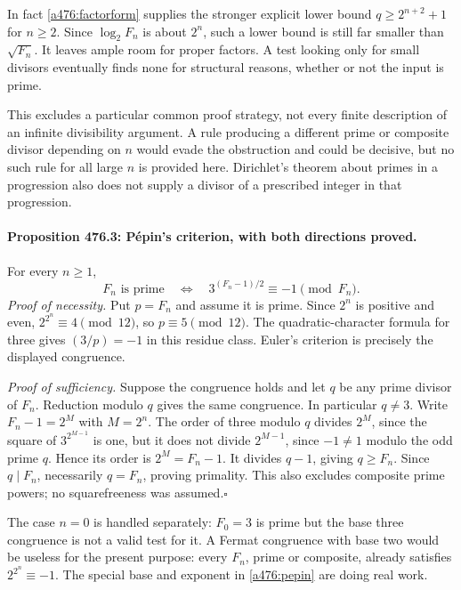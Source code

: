 \documentclass[11pt]{article}
\begin{document}
In fact \eqref{a476:factorform} supplies the stronger explicit lower
bound $q\geq2^{n+2}+1$ for $n\geq2$. Since
$\log_2F_n$ is about $2^n$, such a lower bound is still far smaller
than $\sqrt{F_n}$. It leaves ample room for proper factors. A test
looking only for small divisors eventually finds none for structural
reasons, whether or not the input is prime.

This excludes a particular common proof strategy, not every finite
description of an infinite divisibility argument. A rule producing a
different prime or composite divisor depending on $n$ would evade the
obstruction and could be decisive, but no such rule for all large $n$
is provided here. Dirichlet's theorem about primes in a progression
also does not supply a divisor of a prescribed integer in that progression.

\paragraph{Proposition 476.3: P\'epin's criterion, with both directions proved.}
For every $n\geq1$,
\begin{equation}\label{a476:pepin}
 F_n\text{ is prime}
 \quad\Longleftrightarrow\quad
                    3^{(F_n-1)/2}\equiv-1\pmod{F_n}.
\end{equation}
\emph{Proof of necessity.} Put $p=F_n$ and assume it is prime.
Since $2^n$ is positive and even, $2^{2^n}\equiv4\pmod{12}$, so
$p\equiv5\pmod{12}$. The quadratic-character formula for three
gives $(3/p)=-1$ in this residue class. Euler's criterion is precisely
the displayed congruence.

\emph{Proof of sufficiency.} Suppose the congruence holds and let $q$
be any prime divisor of $F_n$. Reduction modulo $q$ gives the same
congruence. In particular $q\ne3$. Write $F_n-1=2^M$ with $M=2^n$.
The order of three modulo $q$ divides $2^M$, since the square of
$3^{2^{M-1}}$ is one, but it does not divide $2^{M-1}$, since
$-1\ne1$ modulo the odd prime $q$. Hence its order is $2^M=F_n-1$.
It divides $q-1$, giving $q\geq F_n$. Since $q\mid F_n$, necessarily
$q=F_n$, proving primality. This also excludes composite prime powers;
no squarefreeness was assumed.\hfill$\square$

The case $n=0$ is handled separately: $F_0=3$ is prime but the base
three congruence is not a valid test for it. A Fermat congruence with
base two would be useless for the present purpose: every $F_n$, prime
or composite, already satisfies $2^{2^n}\equiv-1$. The special base
and exponent in \eqref{a476:pepin} are doing real work.
\end{document}
